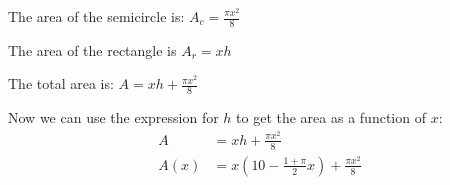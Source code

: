 \documentclass[letterpaper, landscape]{exam}
\begin{document}
  \begin{itemize*}
    \item The area of the semicircle is: $A_c = \frac{\pi  x^2}{8}$
    \item The area of the rectangle is $A_r = xh$
    \item The total area is: $A = xh + \frac{\pi  x^2}{8}$
  \end{itemize*}

  Now we can use the expression for $h$ to get the area as a function of $x$:
  \begin{align*}
    A    & = xh + \frac{\pi  x^2}{8} \\
    A(x) & = x (10-\frac{1 + \pi}{2} x) + \frac{\pi  x^2}{8} \\
  \end{align*}
\end{document}
